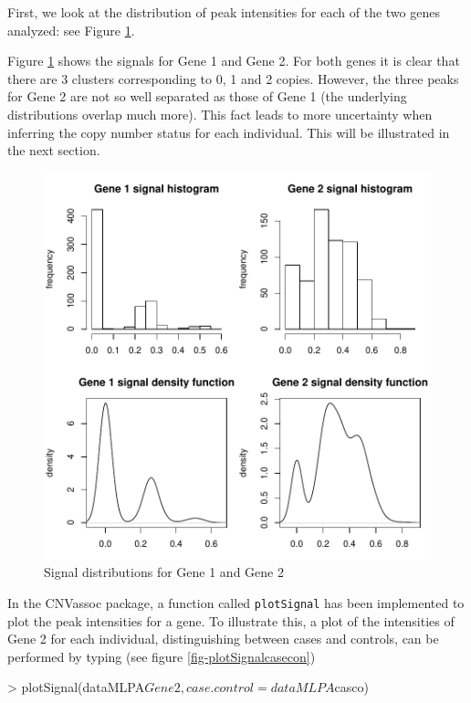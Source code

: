 \documentclass[11pt]{article}
\begin{document}
%


First, we look at the distribution of peak intensities for each of the two genes analyzed: see Figure \ref{fig-MLPAsignal}. 
%


Figure \ref{fig-MLPAsignal} shows the signals for Gene 1 and Gene 2. For both genes it is clear that there are
3 clusters corresponding to 0, 1 and 2 copies. However, the three peaks for Gene 2 are not so well separated as those of Gene 1 (the underlying distributions overlap much more). This fact leads to more uncertainty when inferring the copy number status for each individual. This will be illustrated in the next section.

\begin{figure}[ht]
\begin{center}
\includegraphics{CNVassoc_vignette-005}
\caption{\small Signal distributions for Gene 1 and Gene 2}
\label{fig-MLPAsignal}
\end{center}
\end{figure}

In the CNVassoc package, a function called \texttt{plotSignal} has been implemented to plot the peak intensities for a gene.
To illustrate this, a plot of the intensities of Gene 2 for each individual, distinguishing between cases and controls, can be performed by typing (see figure \ref{fig-plotSignalcasecon}) 
\begin{Schunk}
\begin{Sinput}
> plotSignal(dataMLPA$Gene2,case.control=dataMLPA$casco)
\end{Sinput}
\end{Schunk}
\end{document}
